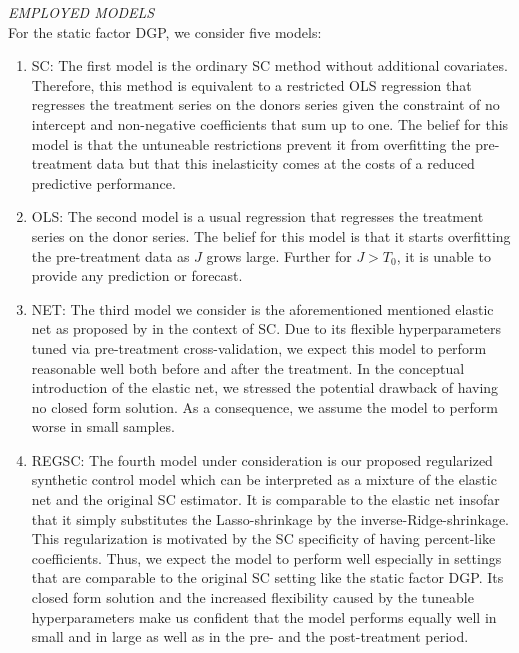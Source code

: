 \textit{EMPLOYED MODELS} \\
For the static factor \ac{DGP}, we consider five models: 
\begin{enumerate}
	\item SC: The first model is the ordinary \ac{SC} method without additional covariates. Therefore, this method is equivalent to a restricted \ac{OLS} regression that regresses the treatment series on the donors series given the constraint of no intercept and non-negative coefficients that sum up to one. The belief for this model is that the untuneable restrictions prevent it from overfitting the pre-treatment data but that this inelasticity comes at the costs of a reduced predictive performance.
	\item OLS: The second model is a usual regression that regresses the treatment series on the donor series. The belief for this model is that it starts overfitting the pre-treatment data as $J$ grows large. Further for $J > T_0$, it is unable to provide any prediction or forecast.
	\item NET: The third model we consider is the aforementioned mentioned elastic net as proposed by \cite{doudchenko:2016} in the context of \ac{SC}. Due to its flexible hyperparameters tuned via pre-treatment cross-validation, we expect this model to perform reasonable well both before and after the treatment. In the conceptual introduction of the elastic net, we stressed the potential drawback of having no closed form solution. As a consequence, we assume the model to perform worse in small samples.
	\item REGSC: The fourth model under consideration is our proposed regularized synthetic control model which can be interpreted as a mixture of the elastic net and the original \ac{SC} estimator. It is comparable to the elastic net insofar that it simply substitutes the Lasso-shrinkage by the inverse-Ridge-shrinkage. This regularization is motivated by the \ac{SC} specificity of having percent-like coefficients. Thus, we expect the model to perform well especially in settings that are comparable to the original \ac{SC} setting like the static factor \ac{DGP}. Its closed form solution and the increased flexibility caused by the tuneable hyperparameters make us confident that the model performs equally well in small and in large as well as in the pre- and the post-treatment period.		   

\end{enumerate}
